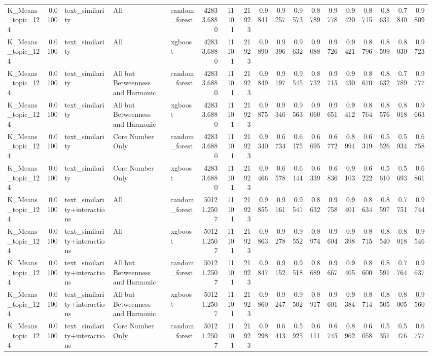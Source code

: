 \begin{tabular}{lrlllrrrrrrrrrrrrr}
K_Means_topic_124 & 0.0100 & text_similarity & All & random_forest & 42833.6880 & 11101 & 21923 & 0.9841 & 0.9257 & 0.9573 & 0.8789 & 0.9778 & 0.9420 & 0.8715 & 0.8631 & 0.7840 & 0.9809 \\
K_Means_topic_124 & 0.0100 & text_similarity & All & xgboost & 42833.6880 & 11101 & 21923 & 0.9890 & 0.9396 & 0.9632 & 0.9088 & 0.9726 & 0.9421 & 0.8796 & 0.8599 & 0.8030 & 0.9723 \\
K_Means_topic_124 & 0.0100 & text_similarity & All but Betweenness and Harmonic & random_forest & 42833.6880 & 11101 & 21923 & 0.9849 & 0.9197 & 0.9545 & 0.8732 & 0.9715 & 0.9430 & 0.8670 & 0.8632 & 0.7789 & 0.9777 \\
K_Means_topic_124 & 0.0100 & text_similarity & All but Betweenness and Harmonic & xgboost & 42833.6880 & 11101 & 21923 & 0.9875 & 0.9346 & 0.9563 & 0.9060 & 0.9651 & 0.9412 & 0.8764 & 0.8576 & 0.8018 & 0.9663 \\
K_Means_topic_124 & 0.0100 & text_similarity & Core Number Only & random_forest & 42833.6880 & 11101 & 21923 & 0.9340 & 0.6734 & 0.6175 & 0.6695 & 0.6772 & 0.8994 & 0.6319 & 0.5526 & 0.5934 & 0.6758 \\
K_Means_topic_124 & 0.0100 & text_similarity & Core Number Only & xgboost & 42833.6880 & 11101 & 21923 & 0.9466 & 0.6578 & 0.6144 & 0.6339 & 0.6836 & 0.9103 & 0.6222 & 0.5610 & 0.5693 & 0.6861 \\
K_Means_topic_124 & 0.0100 & text_similarity+interactions & All & random_forest & 50121.2507 & 11101 & 21923 & 0.9855 & 0.9161 & 0.9541 & 0.8632 & 0.9758 & 0.9401 & 0.8634 & 0.8597 & 0.7751 & 0.9744 \\
K_Means_topic_124 & 0.0100 & text_similarity+interactions & All & xgboost & 50121.2507 & 11101 & 21923 & 0.9863 & 0.9278 & 0.9552 & 0.8974 & 0.9604 & 0.9398 & 0.8715 & 0.8540 & 0.8018 & 0.9546 \\
K_Means_topic_124 & 0.0100 & text_similarity+interactions & All but Betweenness and Harmonic & random_forest & 50121.2507 & 11101 & 21923 & 0.9847 & 0.9152 & 0.9518 & 0.8689 & 0.9667 & 0.9405 & 0.8600 & 0.8591 & 0.7764 & 0.9637 \\
K_Means_topic_124 & 0.0100 & text_similarity+interactions & All but Betweenness and Harmonic & xgboost & 50121.2507 & 11101 & 21923 & 0.9860 & 0.9247 & 0.9502 & 0.8917 & 0.9601 & 0.9384 & 0.8714 & 0.8505 & 0.8005 & 0.9560 \\
K_Means_topic_124 & 0.0100 & text_similarity+interactions & Core Number Only & random_forest & 50121.2507 & 11101 & 21923 & 0.9298 & 0.6413 & 0.5925 & 0.6111 & 0.6745 & 0.8962 & 0.6058 & 0.5351 & 0.5476 & 0.6777 \\

\end{tabular}
